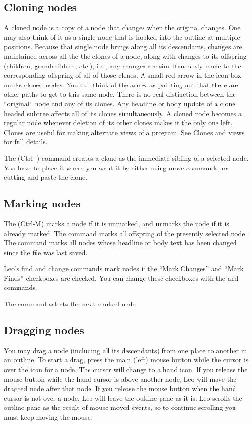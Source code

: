 \documentclass[a4paper,10pt,english]{sphinxmanual}
\begin{document}
\subsection{Cloning nodes}
\label{commands:cloning-nodes}
A cloned node is a copy of a node that changes when the original changes.
One may also think of it as a single node that is hooked into the outline
at multiple positions. Because that single node brings along all its
descendants, changes are maintained across all the the clones of a node,
along with changes to its offspring (children, grandchildren, etc.), i.e.,
any changes are simultaneously made to the corresponding offspring of all
of those clones. A small red arrow in the icon box marks cloned nodes. You
can think of the arrow as pointing out that there are other paths to get to
this same node. There is no real distinction between the ``original'' node
and any of its clones. Any headline or body update of a clone headed
subtree affects all of its clones simultaneously. A cloned node becomes a
regular node whenever deletion of its other clones makes it the only one
left. Clones are useful for making alternate views of a program. See
Clones and views for full details.

The  (Ctrl-{}`) command creates a clone as the immediate
sibling of a selected node. You have to place it where you want it by
either using move commands, or cutting and paste the clone.


\subsection{Marking nodes}
\label{commands:marking-nodes}
The  (Ctrl-M) marks a node if it is unmarked, and unmarks the node
if it is already marked. The  command marks all offspring
of the presently selected node. The  command marks
all nodes whose headline or body text has been changed since the file
was last saved.

Leo's find and change commands mark nodes if the ``Mark Changes'' and ``Mark
Finds'' checkboxes are checked. You can change these checkboxes with the
 and 
commands.

The  command selects the next marked node.


\subsection{Dragging nodes}
\label{commands:dragging-nodes}
You may drag a node (including all its descendants) from one place to
another in an outline. To start a drag, press the main (left) mouse button
while the cursor is over the icon for a node. The cursor will change to a
hand icon. If you release the mouse button while the hand cursor is above
another node, Leo will move the dragged node after that node.
If you release the mouse button when the hand cursor is not over a node,
Leo will leave the outline pane as it is. Leo scrolls the outline pane as
the result of mouse-moved events, so to continue scrolling you must keep
moving the mouse.
\end{document}

